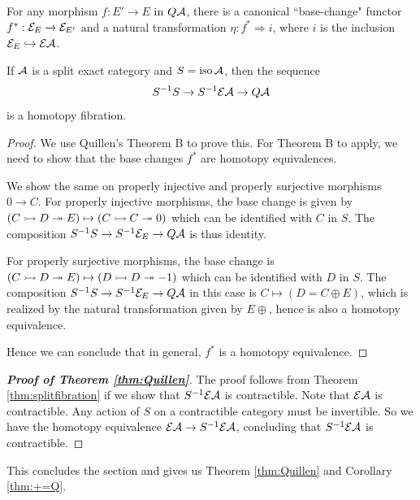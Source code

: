 \begin{lemma}\label{lemma:Qbasechange}
For any morphism $f : E' \to E$ in $Q\mathcal{A}$, there is a canonical ``base-change" functor
$f^* : \mathcal{E}_E \to \mathcal{E}_{E'}$ and a natural transformation $\eta : f^* \Rightarrow i$,
where $i$ is the inclusion $\mathcal{E}_E \hookrightarrow \mathcal{E}\mathcal{A}$.
\end{lemma}

\begin{theorem}\label{thm:splitfibration}
If $\mathcal{A}$ is a split exact category and $S = \operatorname*{iso} \mathcal{A}$, then the sequence
\[S^{-1}S \to S^{-1}\mathcal{E}\mathcal{A} \to Q\mathcal{A}\]
is a homotopy fibration.
\end{theorem}
\begin{proof}
We use Quillen's Theorem B to prove this.
For Theorem B to apply, we need to show that the base changes
$f^*$ are homotopy equivalences.

We show the same on properly injective and properly surjective morphisms $0 \to C$.
For properly injective morphisms, the base change is given by $(C \rightarrowtail D \twoheadrightarrow E) \mapsto (C \rightarrowtail C \twoheadrightarrow 0)$
which can be identified with $C$ in $S$.
The composition $S^{-1}S \to S^{-1}\mathcal{E}_E \to Q\mathcal{A}$ is thus identity.

For properly surjective morphisms, the base change is $(C \rightarrowtail D \twoheadrightarrow E) \mapsto (D \rightarrowtail D \twoheadrightarrow -1)$ which
can be identified with $D$ in $S$.
The composition $S^{-1}S \to S^{-1}\mathcal{E}_E \to Q\mathcal{A}$ in this case is $C \mapsto (D = C \oplus E)$,
which is realized by the natural transformation given by $E \oplus $,
hence is also a homotopy equivalence.

Hence we can conclude that in general, $f^*$ is a homotopy equivalence.
\end{proof}


\begin{proof}[\textbf{Proof of Theorem \ref{thm:Quillen}}]
The proof follows from Theorem \ref{thm:splitfibration} if we show that $S^{-1}\mathcal{E}\mathcal{A}$ is contractible.
Note that $\mathcal{E}\mathcal{A}$ is contractible. Any action of $S$ on a contractible category must be invertible. %
So we have the homotopy equivalence $\mathcal{E}\mathcal{A} \to S^{-1}\mathcal{E}\mathcal{A}$, concluding that $S^{-1}\mathcal{E}\mathcal{A}$ is contractible.
\end{proof}

This concludes the section and gives us Theorem \ref{thm:Quillen} and Corollary \ref{thm:+=Q}.
